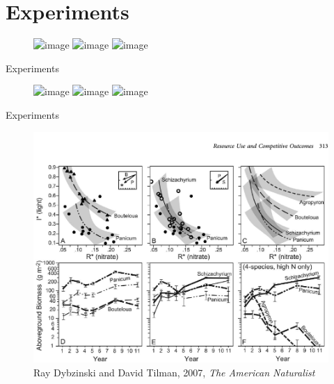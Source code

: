 \documentclass[final,xcolor=dvipsnames]{beamer}
\begin{document}
\section{Experiments}

\begin{frame}
\begin{figure}
       \includegraphics<1>[width=.8\framewidth]{MillerCitation}
       \includegraphics<2>[width=.45\framewidth]{Miller1}
        \includegraphics<2>[width=.45\framewidth]{Miller2}
\end{figure}
\end{frame}

\begin{frame}{Experiments}
\begin{figure}
       \includegraphics<1>[width=.6\framewidth]{TilTest1}
       \includegraphics<2>[width=.8\framewidth]{TilTest0}
       \includegraphics<3>[width=.8\framewidth]{TilTest3}
    \end{figure}
\end{frame}

\begin{frame}{Experiments}
\begin{figure}
       \includegraphics[width=.8\framewidth]{RealCase1}
       \caption{Ray Dybzinski and David Tilman, 2007,\textit{ The American Naturalist}
}
    \end{figure}
\end{frame}
\end{document}
